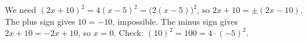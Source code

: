We need $(2x+10)^2=4(x-5)^2=\bigl(2(x-5)\bigr)^2$, so $2x+10=\pm(2x-10)$. The plus sign gives $10=-10$, impossible. The minus sign gives $2x+10=-2x+10$, so $x=\boxed{0}$. Check: $(10)^2=100=4\cdot(-5)^2$.
